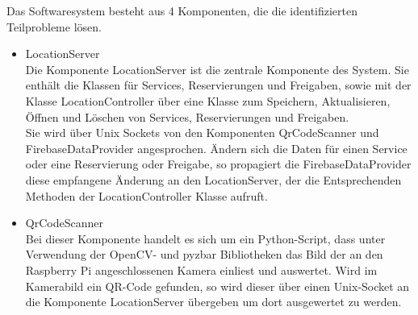 \documentclass[openright,twoside,a4paper]{scrartcl}
\begin{document}
                    Das Softwaresystem besteht aus 4 Komponenten, die die identifizierten Teilprobleme lösen.
                    \begin{itemize}
                        \item LocationServer \\
                        Die Komponente LocationServer ist die zentrale Komponente des System. Sie enthält die Klassen für Services, Reservierungen und Freigaben, sowie mit der Klasse LocationController über eine Klasse zum Speichern, Aktualisieren, Öffnen und Löschen von Services, Reservierungen und Freigaben. \\
                        Sie wird über Unix Sockets von den Komponenten QrCodeScanner und FirebaseDataProvider angesprochen. Ändern sich die Daten für einen Service oder eine Reservierung oder Freigabe, so propagiert die FirebaseDataProvider diese empfangene Änderung an den LocationServer, der die Entsprechenden Methoden der LocationController Klasse aufruft.


                        \item QrCodeScanner \\
                        Bei dieser Komponente handelt es sich um ein Python-Script, dass unter Verwendung der OpenCV- und pyzbar Bibliotheken das Bild der an den Raspberry Pi angeschlossenen Kamera einliest und auswertet.
                        Wird im Kamerabild ein QR-Code gefunden, so wird dieser über einen Unix-Socket an die Komponente LocationServer übergeben um dort ausgewertet zu werden.
                        

\end{itemize}
\end{document}
